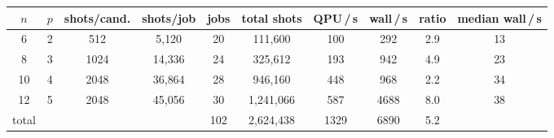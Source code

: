 \begin{tabular}{cccccccccc}
$n$ & $p$ & shots/cand. & shots/job & jobs & total shots & QPU\,/\,s
 & wall\,/\,s & ratio & median wall\,/\,s \\
\hline
6 & 2 & 512 & 5{,}120 & 20 & 111{,}600 & 100 & 292 & 2.9 & 13 \\
8 & 3 & 1024 & 14{,}336 & 24 & 325{,}612 & 193 & 942 & 4.9 & 23 \\
10 & 4 & 2048 & 36{,}864 & 28 & 946{,}160 & 448 & 968 & 2.2 & 34 \\
12 & 5 & 2048 & 45{,}056 & 30 & 1{,}241{,}066 & 587 & 4688 & 8.0 & 38 \\
\hline
total & & & & 102 & 2{,}624{,}438 & 1329 & 6890 & 5.2 & \\
\end{tabular}